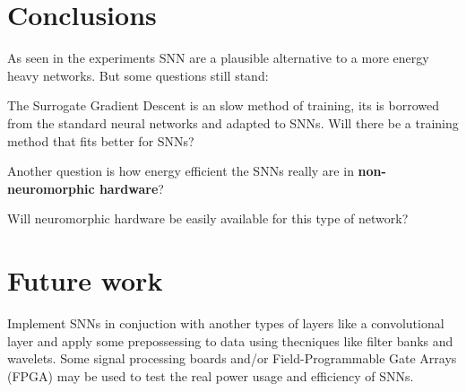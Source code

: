 \section{Conclusions}
\label{sec:conclusions}
	\par As seen in the experiments SNN are a plausible alternative to a more energy heavy networks. But some questions still stand: 
	\par The Surrogate Gradient Descent is an slow method of training, its is borrowed from the standard neural networks and adapted to SNNs. Will there be a training method that fits better for SNNs? 
	\par Another question is how energy efficient the SNNs really are in \textbf{non-neuromorphic hardware}?
	\par Will neuromorphic hardware be easily available for this type of network?
	
\section{Future work}
	\label{sec:future}
	\par Implement SNNs in conjuction with another types of layers like a convolutional layer and apply some prepossessing to data using thecniques like filter banks and wavelets. Some signal processing boards and/or Field-Programmable Gate Arrays (FPGA) may be used to test the real power usage and efficiency of SNNs.